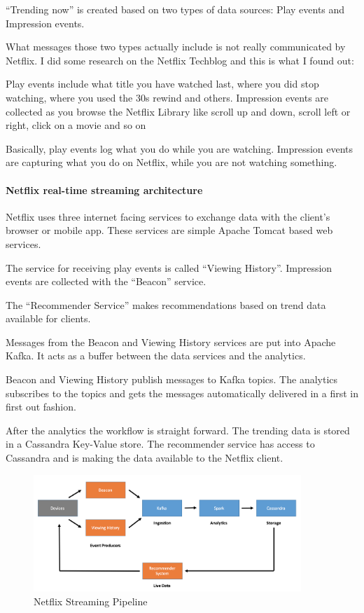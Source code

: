 \documentclass[12pt]{scrartcl} %
\begin{document}
“Trending now” is created based on two types of data sources: Play events and Impression events.

What messages those two types actually include is not really communicated by Netflix. I did some research on the Netflix Techblog and this is what I found out:

Play events include what title you have watched last, where you did stop watching, where you used the 30s rewind and others.
Impression events are collected as you browse the Netflix Library like scroll up and down, scroll left or right, click on a movie and so on

Basically, play events log what you do while you are watching. Impression events are capturing what you do on Netflix, while you are not watching something.

\paragraph{Netflix real-time streaming architecture}
Netflix uses three internet facing services to exchange data with the client’s browser or mobile app. These services are simple Apache Tomcat based web services.

The service for receiving play events is called “Viewing History”. Impression events are collected with the “Beacon” service.

The “Recommender Service” makes recommendations based on trend data available for clients.

Messages from the Beacon and Viewing History services are put into Apache Kafka.
It acts as a buffer between the data services and the analytics.

Beacon and Viewing History publish messages to Kafka topics. The analytics subscribes to the topics and gets the messages automatically delivered in a first in first out fashion.

After the analytics the workflow is straight forward. The trending data is stored in a Cassandra Key-Value store. The recommender service has access to Cassandra and is making the data available to the Netflix client.

\begin{figure}[htbp] 
  \centering
     \includegraphics[width=0.9\textwidth]{images/Netflix-Streaming-Pipeline}
  \caption{Netflix Streaming Pipeline}
  \label{fig:Bild1}
\end{figure}
\end{document}
